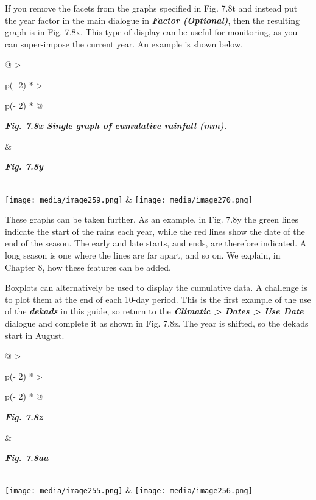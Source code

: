 \documentclass[
  letterpaper,
  DIV=11,
  numbers=noendperiod]{scrreprt}
\begin{document}
If you remove the facets from the graphs specified in Fig. 7.8t and
instead put the year factor in the main dialogue in \textbf{\emph{Factor
(Optional)}}, then the resulting graph is in Fig. 7.8x. This type of
display can be useful for monitoring, as you can super-impose the
current year. An example is shown below.

\begin{longtable}[]{@{}
  >{\raggedright\arraybackslash}p{(\columnwidth - 2\tabcolsep) * }
  >{\raggedright\arraybackslash}p{(\columnwidth - 2\tabcolsep) * }@{}}
\toprule\noalign{}
\begin{minipage}[b]{\linewidth}\raggedright
\textbf{\emph{Fig. 7.8x Single graph of cumulative rainfall (mm).}}
\end{minipage} & \begin{minipage}[b]{\linewidth}\raggedright
\textbf{\emph{Fig. 7.8y}}
\end{minipage} \\
\midrule\noalign{}
\endhead
\bottomrule\noalign{}
\endlastfoot
\texttt{[image: media/image259.png]} &
\texttt{[image: media/image270.png]} \\
\end{longtable}

These graphs can be taken further. As an example, in Fig. 7.8y the green
lines indicate the start of the rains each year, while the red lines
show the date of the end of the season. The early and late starts, and
ends, are therefore indicated. A long season is one where the lines are
far apart, and so on. We explain, in Chapter 8, how these features can
be added.

Boxplots can alternatively be used to display the cumulative data. A
challenge is to plot them at the end of each 10-day period. This is the
first example of the use of the \textbf{\emph{dekads}} in this guide, so
return to the \textbf{\emph{Climatic \textgreater{} Dates \textgreater{}
Use Date}} dialogue and complete it as shown in Fig. 7.8z. The year is
shifted, so the dekads start in August.

\begin{longtable}[]{@{}
  >{\raggedright\arraybackslash}p{(\columnwidth - 2\tabcolsep) * }
  >{\raggedright\arraybackslash}p{(\columnwidth - 2\tabcolsep) * }@{}}
\toprule\noalign{}
\begin{minipage}[b]{\linewidth}\raggedright
\textbf{\emph{Fig. 7.8z}}
\end{minipage} & \begin{minipage}[b]{\linewidth}\raggedright
\textbf{\emph{Fig. 7.8aa}}
\end{minipage} \\
\midrule\noalign{}
\endhead
\bottomrule\noalign{}
\endlastfoot
\texttt{[image: media/image255.png]} &
\texttt{[image: media/image256.png]} \\
\end{longtable}
\end{document}
